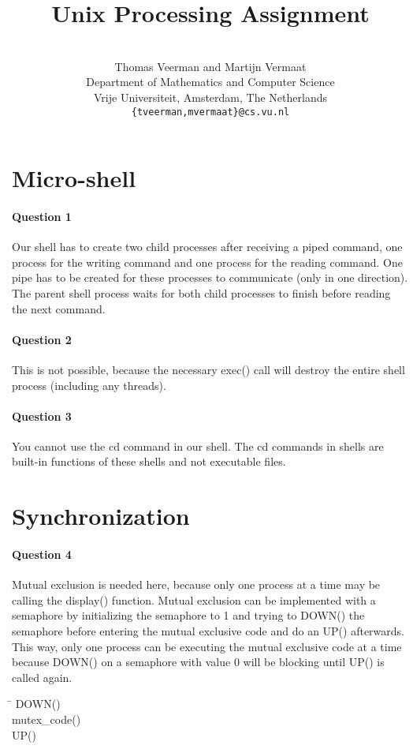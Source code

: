 \documentclass[a4paper,10pt]{article}
\title{Unix Processing Assignment}
\author{%
        \mbox{}\\
	Thomas Veerman and Martijn Vermaat\\
	Department of Mathematics and Computer Science\\
	Vrije Universiteit, Amsterdam, The Netherlands
        \mbox{}\\ 
        \texttt{\{tveerman,mvermaat\}@cs.vu.nl}
}
\begin{document}
\maketitle

\section{Micro-shell}
\paragraph{Question 1}
Our shell has to create two child processes after receiving a piped command, one process for the writing command and one process for the reading command. One pipe has to be created for these processes to communicate (only in one direction). The parent shell process waits for both child processes to finish before reading the next command.

\paragraph{Question 2}
This is not possible, because the necessary exec() call will destroy the entire shell process (including any threads).

\paragraph{Question 3}
You cannot use the cd command in our shell. The cd commands in shells are built-in functions of these shells and not executable files.

\section{Synchronization}
\paragraph{Question 4}
Mutual exclusion is needed here, because only one process at a time may be calling the display() function. Mutual exclusion can be implemented with a semaphore by initializing the semaphore to 1 and trying to DOWN() the semaphore before entering the mutual exclusive code and do an UP() afterwards. This way, only one process can be executing the mutual exclusive code at a
time because DOWN() on a semaphore with value 0 will be blocking until UP() is called again.
\begin{tabbing}
\hspace{20pt}\=\kill
 \> DOWN()\\ 
 \> mutex\_code()\\ 
 \> UP() 
\end{tabbing}
\end{document}
